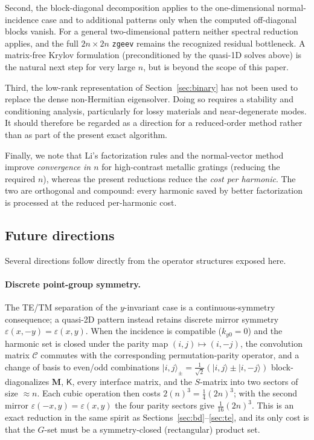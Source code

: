 \documentclass[11pt]{article}
\theoremstyle{remark}
\newcommand{\eps}{\varepsilon}
\newcommand{\Cmat}{\mathcal{C}}
\newcommand{\kp}{\mathsf{K}}
\begin{document}
Second, the block-diagonal decomposition applies to the one-dimensional normal-
incidence case and to additional patterns only when the computed off-diagonal
blocks vanish.  For a general two-dimensional pattern neither spectral
reduction applies, and the full $2n\times2n$ \texttt{zgeev} remains the
recognized residual bottleneck. A matrix-free Krylov formulation
(preconditioned by the quasi-1D solves above) is the natural next step for
very large $n$, but is beyond the scope of this paper.

Third, the low-rank representation of Section~\ref{sec:binary} has not been
used to replace the dense non-Hermitian eigensolver.  Doing so requires a
stability and conditioning analysis, particularly for lossy materials and
near-degenerate modes.  It should therefore be regarded as a direction for a
reduced-order method rather than as part of the present exact algorithm.

Finally, we note that Li's factorization rules \cite{li1996fourier} and the
normal-vector method \cite{li1997formulation} improve \emph{convergence in
$n$} for high-contrast metallic gratings (reducing the required $n$), whereas
the present reductions reduce the \emph{cost per harmonic}. The two are
orthogonal and compound: every harmonic saved by better factorization is
processed at the reduced per-harmonic cost.

\subsection{Future directions}
\label{sec:future}

Several directions follow directly from the operator structures exposed here.

\paragraph{Discrete point-group symmetry.}
The TE/TM separation of the $y$-invariant case is a continuous-symmetry
consequence; a quasi-2D pattern instead retains discrete mirror symmetry
$\eps(x,-y)=\eps(x,y)$.  When the incidence is compatible ($k_{y0}=0$) and the
harmonic set is closed under the parity map $(i,j)\mapsto(i,-j)$, the
convolution matrix $\Cmat$ commutes with the corresponding permutation-parity
operator, and a change of basis to even/odd combinations
$|i,j\rangle_\pm=\tfrac1{\sqrt2}(|i,j\rangle\pm|i,-j\rangle)$ block-
diagonalizes $\mathbf{M}$, $\kp$, every interface matrix, and the $S$-matrix
into two sectors of size $\approx n$.  Each cubic operation then costs
$2(n)^3=\tfrac14(2n)^3$; with the second mirror $\eps(-x,y)=\eps(x,y)$ the four
parity sectors give $\tfrac1{16}(2n)^3$.  This is an exact reduction in the same
spirit as Sections~\ref{sec:bd}--\ref{sec:te}, and its only cost is that the
$G$-set must be a symmetry-closed (rectangular) product set.
\end{document}
